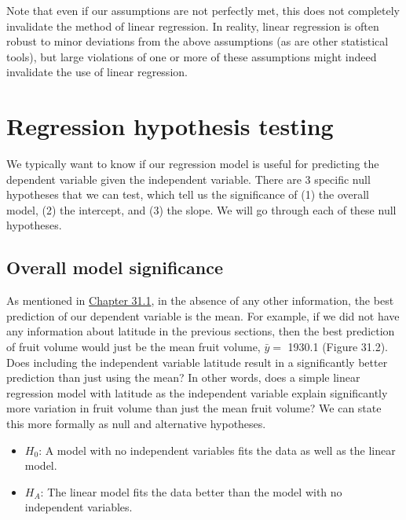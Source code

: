 \documentclass[
]{scrbook}
\providecommand{\tightlist}{%
  \setlength{\itemsep}{0pt}\setlength{\parskip}{0pt}}
\begin{document}
Note that even if our assumptions are not perfectly met, this does not completely invalidate the method of linear regression.
In reality, linear regression is often robust to minor deviations from the above assumptions (as are other statistical tools), but large violations of one or more of these assumptions might indeed invalidate the use of linear regression.

\hypertarget{regression-hypothesis-testing}{%
\section{Regression hypothesis testing}\label{regression-hypothesis-testing}}

We typically want to know if our regression model is useful for predicting the dependent variable given the independent variable.
There are 3 specific null hypotheses that we can test, which tell us the significance of (1) the overall model, (2) the intercept, and (3) the slope.
We will go through each of these null hypotheses.

\hypertarget{overall-model-significance}{%
\subsection{Overall model significance}\label{overall-model-significance}}

As mentioned in \protect\hyperlink{visual-interpretation-of-regression}{Chapter 31.1}, in the absence of any other information, the best prediction of our dependent variable is the mean.
For example, if we did not have any information about latitude in the previous sections, then the best prediction of fruit volume would just be the mean fruit volume, \(\bar{y} =\) 1930.1 (Figure 31.2).
Does including the independent variable latitude result in a significantly better prediction than just using the mean?
In other words, does a simple linear regression model with latitude as the independent variable explain significantly more variation in fruit volume than just the mean fruit volume?
We can state this more formally as null and alternative hypotheses.

\begin{itemize}
\tightlist
\item
  \(H_{0}\): A model with no independent variables fits the data as well as the linear model.
\item
  \(H_{A}\): The linear model fits the data better than the model with no independent variables.
\end{itemize}
\end{document}
